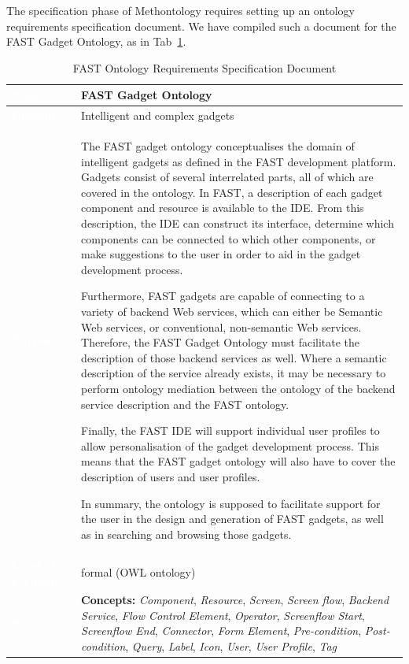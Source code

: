 \documentclass[twoside]{fast_latex}
\begin{document}
The specification phase of Methontology requires setting up an ontology requirements specification document. We have compiled such a document for the FAST Gadget Ontology, as in Tab~\ref{tab:ontology_requirements_spec}.

\singlespacing
\begin{small}
\begin{longtable}[t]{|>{\columncolor{fast@lightgrey}}p{3.25cm}|p{11cm}|}
\caption{\label{tab:ontology_requirements_spec}FAST Ontology Requirements Specification Document}\\
\hline
\textcolor{white}{\textbf{Name}} & \textbf{FAST Gadget Ontology} \\ \hline
\textcolor{white}{\textbf{Domain}} & Intelligent and complex gadgets \\ \hline
\textcolor{white}{\textbf{Purpose}} & The FAST gadget ontology conceptualises the domain of intelligent gadgets as defined in the FAST development platform. Gadgets consist of several interrelated parts, all of which are covered in the ontology. In FAST, a description of each gadget component and resource is available to the IDE. From this description, the IDE can construct its interface, determine which components can be connected to which other components, or make suggestions to the user in order to aid in the gadget development process.

Furthermore, FAST gadgets are capable of connecting to a variety of backend Web services, which can either be Semantic Web services, or conventional, non-semantic Web services. Therefore, the FAST Gadget Ontology must facilitate the description of those backend services as well. Where a semantic description of the service already exists, it may be necessary to perform ontology mediation between the ontology of the backend service description and the FAST ontology.

Finally, the FAST IDE will support individual user profiles to allow personalisation of the gadget development process. This means that the FAST gadget ontology will also have to cover the description of users and user profiles.

In summary, the ontology is supposed to facilitate support for the user in the design and generation of FAST gadgets, as well as in searching and browsing those gadgets.\\ \hline 
\textcolor{white}{\textbf{Level of Formality}} & formal (OWL ontology) \\ \hline
\textcolor{white}{\textbf{Scope}} & \textbf{Concepts:} \emph{Component}, \emph{Resource}, \emph{Screen}, \emph{Screen flow}, \emph{Backend Service}, \emph{Flow Control Element}, \emph{Operator}, \emph{Screenflow Start}, \emph{Screenflow End}, \emph{Connector}, \emph{Form Element}, \emph{Pre-condition}, \emph{Post-condition}, \emph{Query}, \emph{Label}, \emph{Icon}, \emph{User}, \emph{User Profile}, \emph{Tag}


\end{longtable}
\end{small}
\end{document}
